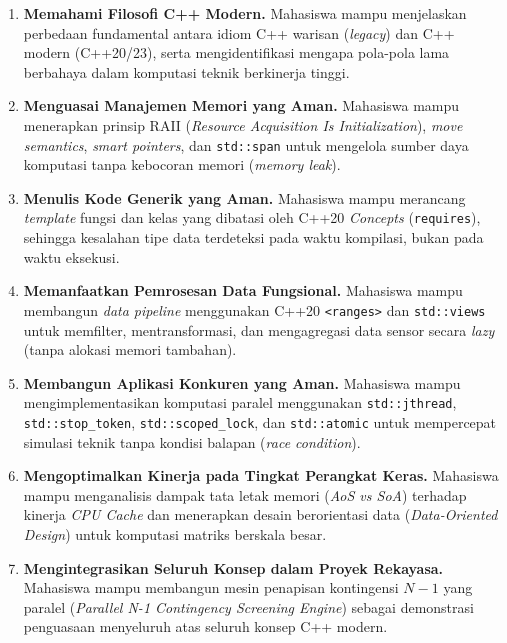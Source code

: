 \documentclass[12pt,a4paper]{article}
\begin{document}
\begin{enumerate}[label=\textbf{CPMK-\arabic*}, leftmargin=2.5cm, itemsep=0.3cm]
    \item \textbf{Memahami Filosofi C++ Modern.}
    Mahasiswa mampu menjelaskan perbedaan fundamental antara idiom C++ warisan (\textit{legacy}) dan C++ modern (C++20/23), serta mengidentifikasi mengapa pola-pola lama berbahaya dalam komputasi teknik berkinerja tinggi.

    \item \textbf{Menguasai Manajemen Memori yang Aman.}
    Mahasiswa mampu menerapkan prinsip RAII (\textit{Resource Acquisition Is Initialization}), \textit{move semantics}, \textit{smart pointers}, dan \texttt{std::span} untuk mengelola sumber daya komputasi tanpa kebocoran memori (\textit{memory leak}).

    \item \textbf{Menulis Kode Generik yang Aman.}
    Mahasiswa mampu merancang \textit{template} fungsi dan kelas yang dibatasi oleh C++20 \textit{Concepts} (\texttt{requires}), sehingga kesalahan tipe data terdeteksi pada waktu kompilasi, bukan pada waktu eksekusi.

    \item \textbf{Memanfaatkan Pemrosesan Data Fungsional.}
    Mahasiswa mampu membangun \textit{data pipeline} menggunakan C++20 \texttt{<ranges>} dan \texttt{std::views} untuk memfilter, mentransformasi, dan mengagregasi data sensor secara \textit{lazy} (tanpa alokasi memori tambahan).

    \item \textbf{Membangun Aplikasi Konkuren yang Aman.}
    Mahasiswa mampu mengimplementasikan komputasi paralel menggunakan \texttt{std::jthread}, \texttt{std::stop\_token}, \texttt{std::scoped\_lock}, dan \texttt{std::atomic} untuk mempercepat simulasi teknik tanpa kondisi balapan (\textit{race condition}).

    \item \textbf{Mengoptimalkan Kinerja pada Tingkat Perangkat Keras.}
    Mahasiswa mampu menganalisis dampak tata letak memori (\textit{AoS vs SoA}) terhadap kinerja \textit{CPU Cache} dan menerapkan desain berorientasi data (\textit{Data-Oriented Design}) untuk komputasi matriks berskala besar.

    \item \textbf{Mengintegrasikan Seluruh Konsep dalam Proyek Rekayasa.}
    Mahasiswa mampu membangun mesin penapisan kontingensi $N-1$ yang paralel (\textit{Parallel N-1 Contingency Screening Engine}) sebagai demonstrasi penguasaan menyeluruh atas seluruh konsep C++ modern.
\end{enumerate}
\end{document}
